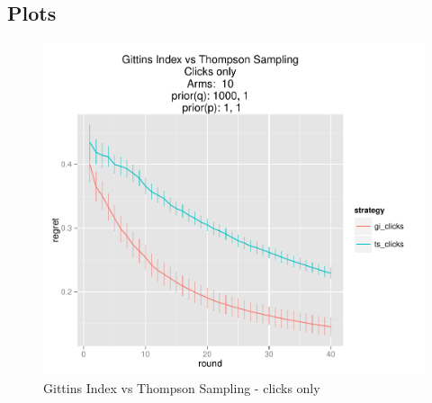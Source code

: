 \documentclass[11pt,a4,singlespacing,titlepagenumber=on]{scrreprt}
\numberwithin{equation}{chapter} %
\theoremstyle{remark}
\begin{document}
\subsection{Plots}

\begin{figure}[p]
    \centering
    \includegraphics[scale=0.7]{GIvsTS.pdf}
    \caption{ Gittins Index vs Thompson Sampling - clicks only }
\end{figure}
\end{document}
